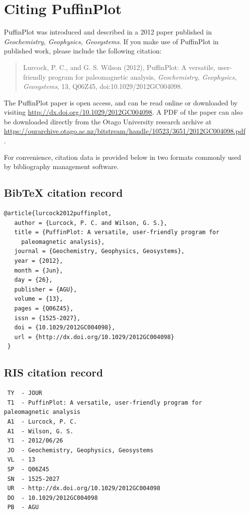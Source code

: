 \documentclass[a4paper,british]{article}
\begin{document}
\clearpage
\appendix
\section{Citing PuffinPlot\label{sec:citing-puffinplot}}

PuffinPlot was introduced and described in a 2012 paper published
in \emph{Geochemistry, Geophysics, Geosystems}. If you make use of
PuffinPlot in published work, please include the following citation:

\begin{quote}
Lurcock, P. C., and G. S. Wilson (2012), PuffinPlot: A versatile,
user-friendly program for paleomagnetic analysis, \emph{Geochemistry,
  Geophysics, Geosystems}, 13, Q06Z45, doi:10.1029/2012GC004098.
\end{quote}

\noindent The PuffinPlot paper is open access, and can be read online or
downloaded by visiting \url{http://dx.doi.org/10.1029/2012GC004098}. A
PDF of the paper can also be downloaded directly from the Otago
University research archive at
\url{https://ourarchive.otago.ac.nz/bitstream/handle/10523/3651/2012GC004098.pdf
}.

For convenience, citation data is provided below in two formats commonly
used by bibliography management software.

\subsection*{BibTeX citation record}
\small
\begin{verbatim}
@article{lurcock2012puffinplot,
   author = {Lurcock, P. C. and Wilson, G. S.},
   title = {PuffinPlot: A versatile, user-friendly program for
     paleomagnetic analysis},
   journal = {Geochemistry, Geophysics, Geosystems},
   year = {2012},
   month = {Jun},
   day = {26},
   publisher = {AGU},
   volume = {13},
   pages = {Q06Z45},
   issn = {1525-2027},
   doi = {10.1029/2012GC004098},
   url = {http://dx.doi.org/10.1029/2012GC004098}
 }
\end{verbatim}

\subsection*{RIS citation record}
\small
\begin{verbatim}
 TY  - JOUR
 T1  - PuffinPlot: A versatile, user-friendly program for paleomagnetic analysis
 A1  - Lurcock, P. C.
 A1  - Wilson, G. S.
 Y1  - 2012/06/26
 JO  - Geochemistry, Geophysics, Geosystems
 VL  - 13
 SP  - Q06Z45
 SN  - 1525-2027
 UR  - http://dx.doi.org/10.1029/2012GC004098
 DO  - 10.1029/2012GC004098
 PB  - AGU
\end{verbatim}
\end{document}
